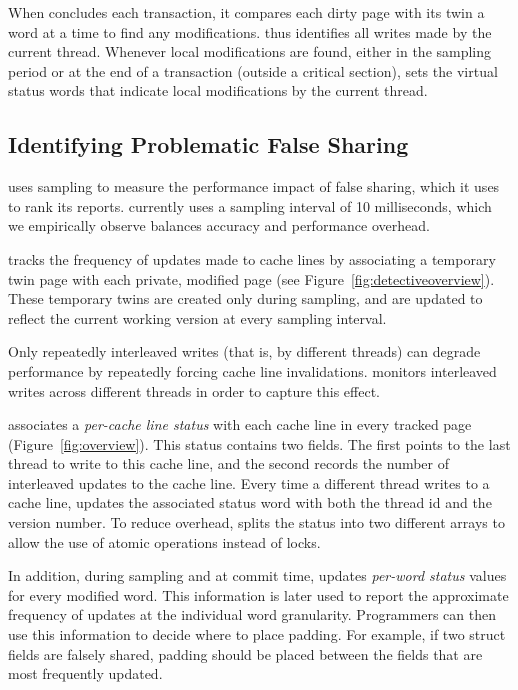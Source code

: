When \sheriffdetect{} concludes each transaction, it compares each dirty page
with its twin a word at a time to find any modifications. \sheriffdetect{} thus
identifies all writes made by the current thread. 
Whenever local modifications are found, either in the sampling period or
at the end of a transaction (outside a critical section), \sheriffdetect{}
sets the virtual status words that indicate local modifications by the
current thread.

\subsection{Identifying Problematic False Sharing}
\label{detection:sampling}

\sheriffdetect{} uses sampling to measure the performance impact of
false sharing, which it uses to rank its reports.  \sheriffdetect{}
currently uses a sampling interval of 10 milliseconds, which we
empirically observe balances accuracy and performance overhead.

\sheriffdetect{} tracks the frequency of updates made to cache lines
by associating a temporary twin page with each private, modified page
(see Figure~{\ref{fig:detectiveoverview}}). These temporary twins are
created only during sampling, and are updated to reflect the current
working version at every sampling interval.

\label{detection:invalidation}

Only repeatedly interleaved writes (that is, by different threads) can
degrade performance by repeatedly forcing cache line
invalidations.  \sheriffdetect{} monitors interleaved writes across
different threads in order to capture this effect.

\sheriffdetect{} associates a \emph{per-cache line status} with
each cache line in every tracked page
(Figure~\ref{fig:overview}). This status contains two fields. The
first points to the last thread to write to this cache line, and the
second records the number of interleaved updates to the cache line.
Every time a different thread writes to a cache line, \sheriffdetect{}
updates the associated status word with both the thread id and the
version number. To reduce overhead, \sheriffdetect{} splits the
status into two different arrays to allow the use of atomic operations
instead of locks.

In addition, during sampling and at commit time, \sheriffdetect{}
updates \emph{per-word status} values for every modified word. This
information is later used to report the approximate frequency of
updates at the individual word granularity. Programmers can then use
this information to decide where to place padding. For example, if two
struct fields are falsely shared, padding should be placed
between the fields that are most frequently updated.

